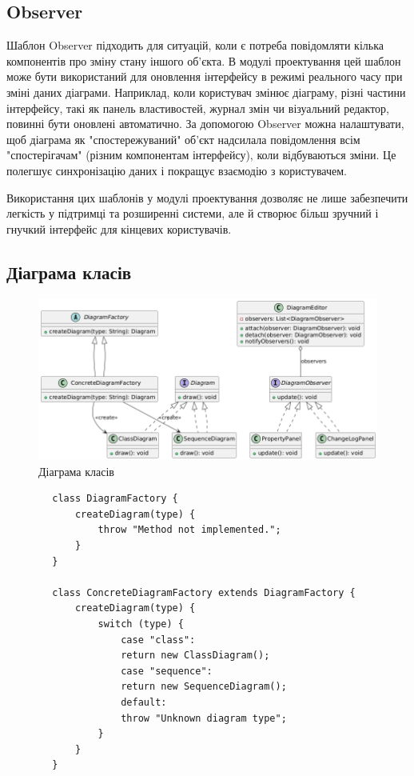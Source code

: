 \documentclass[oneside,14pt]{extarticle}
\begin{document}
\begin{normalsize}
    \subsection*{Observer}
    Шаблон Observer підходить для ситуацій, коли є потреба повідомляти кілька компонентів про зміну стану іншого об’єкта. В модулі проектування цей шаблон може бути використаний для оновлення інтерфейсу в режимі реального часу при зміні даних діаграми. Наприклад, коли користувач змінює діаграму, різні частини інтерфейсу, такі як панель властивостей, журнал змін чи візуальний редактор, повинні бути оновлені автоматично. За допомогою Observer можна налаштувати, щоб діаграма як "спостережуваний" об'єкт надсилала повідомлення всім "спостерігачам" (різним компонентам інтерфейсу), коли відбуваються зміни. Це полегшує синхронізацію даних і покращує взаємодію з користувачем.
    
    Використання цих шаблонів у модулі проектування дозволяє не лише забезпечити легкість у підтримці та розширенні системи, але й створює більш зручний і гнучкий інтерфейс для кінцевих користувачів.
    
    \subsection*{Діаграма класів}
    \begin{figure}[H]
    	\centering
    	\includegraphics[width=\columnwidth]{1}
    	\caption{Діаграма класів}
    \end{figure}
    
    \begin{lstlisting}
    	class DiagramFactory {
    		createDiagram(type) {
    			throw "Method not implemented.";
    		}
    	}
    	
    	class ConcreteDiagramFactory extends DiagramFactory {
    		createDiagram(type) {
    			switch (type) {
    				case "class":
    				return new ClassDiagram();
    				case "sequence":
    				return new SequenceDiagram();
    				default:
    				throw "Unknown diagram type";
    			}
    		}
    	}
    	

\end{lstlisting}
\end{normalsize}
\end{document}
